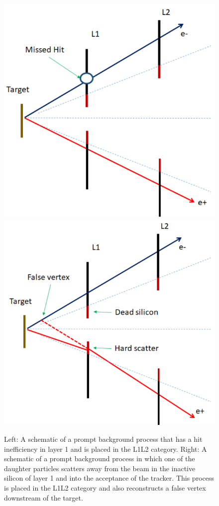 
\begin{figure}[t]
    \centering
    \includegraphics[width=.45\textwidth]{figs/selection/L1L2_background1.png}
    \includegraphics[width=.45\textwidth]{figs/selection/L1L2_background2.png}
    \caption{Left: A schematic of a prompt background process that has a hit inefficiency in layer 1 and is placed in the L1L2 category. Right: A schematic of a prompt background process in which one of the daughter particles scatters away from the beam in the inactive silicon of layer 1 and into the acceptance of the tracker. This process is placed in the L1L2 category and also reconstructs a false vertex downstream of the target.}
    \label{fig:L1L2_background}
\end{figure}

